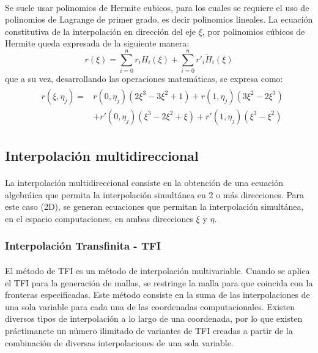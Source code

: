 \documentclass[letterpaper, openright, 12pt]{book}
\begin{document}
    \paragraph*{}
    Se suele usar polinomios de Hermite cubicos, para los cuales se requiere
    el uso de polinomios de Lagrange de primer grado, es decir polinomios
    lineales. La ecuación constitutiva de la interpolación en dirección del
    eje $\xi$, por polinomios cúbicos de Hermite queda expresada de la
    siguiente manera:
    \begin{equation}
        r(\xi) = \sum_{i = 0}^{n} r_{i}H_{i}(\xi) + \sum_{i = 0}^{n} r\prime_{i}\widetilde{H}_{i}(\xi)
    \end{equation}
    que a su vez, desarrollando las operaciones matemáticas, se expresa como:
    \begin{align}
        &\begin{aligned}
            r(\xi, \eta_{j}) =& r(0, \eta_{j})(2\xi^3 - 3\xi^2 +1)
                        + r(1, \eta_{j})(3\xi^2 - 2\xi^3) \\
                        &+ r\prime(0, \eta_{j})(\xi^3 - 2\xi^2 + \xi)
                        + r\prime(1, \eta_{j})(\xi^3 - \xi^2)
        \end{aligned}
    \end{align}

    \subsection{Interpolación multidireccional}
    \paragraph*{}
    La interpolación multidireccional consiste en la obtención de una
    ecuación algebráica que permita la interpolación simultánea en 2 o más
    direcciones. Para este caso (2D), se generan ecuaciones que permitan la
    interpolación simultánea, en el espacio computaciones, en ambas
    direcciones $\xi$ y $\eta$.

    \subsubsection{Interpolación Transfinita - TFI}
    \paragraph*{}
    El método de TFI es un método de interpolación multivariable. Cuando se
    aplica el TFI para la generación de mallas, se restringe la malla para
    que coincida con la fronteras especificadas. Este método consiste en la
    suma de las interpolaciones de una sola variable para cada una de las
    coordenadas computacionales. Existen diversos tipos de interpolación a
    lo largo de una coordenada, por lo que existen práctimanete un número
    ilimitado de variantes de TFI creadas a partir de la combinación de
    diversas interpolaciones de una sola variable.\cite{thompsonhandbook}
\end{document}
